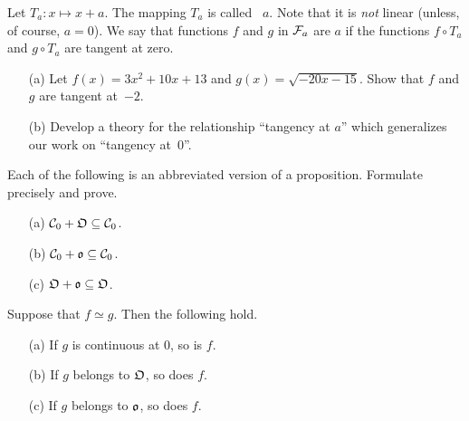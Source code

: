 \begin{prob}\label{tan_at_a} Let $T_a \colon x \mapsto x + a$. The mapping $T_a$ is called
~$a$. Note that it is \emph{not} linear (unless, of course, $a = 0$). We
say that functions $f$ and $g$ in $\mathcal{F}_a$ are
 $a$ if the functions $f \circ T_a$ and $g \circ T_a$ are tangent at zero.
 \begin{enumerate}
  \item[(a)] Let $f(x) = 3x^2 + 10x + 13$ and $g(x) = \sqrt{-20x -15}$. Show that $f$ and
$g$ are tangent at~$-2$.
  \item[(b)] Develop a theory  for the relationship ``tangency at $a$'' which generalizes
our work on ``tangency at~$0$''.
 \end{enumerate}
\end{prob}


\begin{prob} Each of the following is an abbreviated version of a proposition.  Formulate
precisely and prove.
 \begin{enumerate}
  \item[(a)] $\mathcal{C}_0 + \mathfrak{O} \subseteq \mathcal{C}_0$.
  \item[(b)] $\mathcal{C}_0 + \mathfrak{o} \subseteq \mathcal{C}_0$.
  \item[(c)] $\mathfrak{O} + \mathfrak{o} \subseteq \mathfrak{O}$.
 \end{enumerate}
\end{prob}

\begin{prob}  Suppose that $f \simeq g$. Then the following hold.
 \begin{enumerate}
  \item[(a)] If $g$ is continuous at 0, so is $f$.
  \item[(b)] If $g$ belongs to $\mathfrak{O}$, so does $f$.
  \item[(c)] If $g$ belongs to $\mathfrak{o}$, so does $f$.
 \end{enumerate}
\end{prob}






